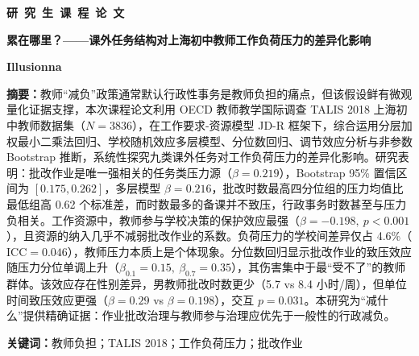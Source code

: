 \documentclass[zihao = -4, linespread = 1.5]{article}
\begin{document}

\clearpage
\vspace*{10em}

\centerline{\heiti\bfseries{}研~究~生~课~程~论~文}
\vspace*{4.2em}
\begin{center}
    \parbox{0.8\textwidth}{
    \centering\bfseries{}
        累在哪里？——课外任务结构对上海初中教师工作负荷压力的差异化影响
    }
\end{center}

\vspace*{1.8em}
\centerline{\bfseries{}Illusionna}
\vspace*{3.2em}

\noindent\textbf{摘要：}教师“减负”政策通常默认行政性事务是教师负担的痛点，但该假设鲜有微观量化证据支撑，本次课程论文利用 OECD 教师教学国际调查 TALIS 2018 上海初中教师数据集（$N=3836$），在工作要求-资源模型 JD-R 框架下，综合运用分层加权最小二乘法回归、学校随机效应多层模型、分位数回归、调节效应分析与非参数 Bootstrap 推断，系统性探究九类课外任务对工作负荷压力的差异化影响。研究表明：批改作业是唯一强相关的任务类压力源（$\beta=0.219$），Bootstrap 95\% 置信区间为 $[0.175, 0.262]$，多层模型 $\beta=0.216$，批改时数最高四分位组的压力均值比最低组高 0.62 个标准差，而时数最多的备课并不致压，行政事务时数甚至与压力负相关。工作资源中，教师参与学校决策的保护效应最强（$\beta=-0.198,\ p<0.001$），且资源的纳入几乎不减弱批改作业的系数。负荷压力的学校间差异仅占 4.6\%（$\text{ICC}=0.046$），教师压力本质上是个体现象。分位数回归显示批改作业的致压效应随压力分位单调上升（$\beta_{0.1}=0.15,\ \beta_{0.7}=0.35$），其伤害集中于最“受不了”的教师群体。该效应存在性别差异，男教师批改时数更少（5.7 vs 8.4 小时/周），但单位时间致压效应更强（$\beta=0.29$ vs $\beta=0.198$），交互 $p=0.031$。本研究为“减什么”提供精确证据：作业批改治理与教师参与治理应优先于一般性的行政减负。

\vspace*{1em}

\noindent\textbf{关键词：}教师负担；TALIS 2018；工作负荷压力；批改作业
\end{document}
